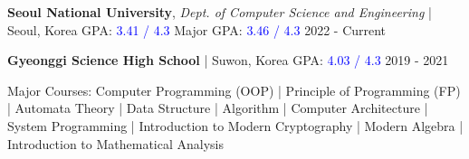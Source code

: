 



\begin{cvhonors}

  \cvhonor
    { {\bf Seoul National University}, \textit{Dept. of Computer Science and Engineering} | Seoul, Korea \newline GPA: \textcolor{blue}{3.41 / 4.3} \hspace{1em} Major GPA: \textcolor{blue}{3.46 / 4.3} } %
    {2022 - Current} %

  \cvhonor
    { {\bf Gyeonggi Science High School} | Suwon, Korea \hspace{1em} GPA: \textcolor{blue}{4.03 / 4.3}} %
    {2019 - 2021} %


\end{cvhonors}



\begin{cvparagraph}
{\normalsize{Major Courses:} Computer Programming (OOP) | Principle of Programming (FP) | Automata Theory | Data Structure | Algorithm | Computer Architecture | System Programming | Introduction to Modern Cryptography | Modern Algebra | Introduction to Mathematical Analysis \\}
\end{cvparagraph}




    
